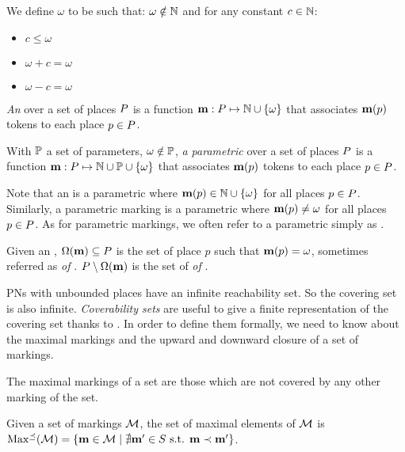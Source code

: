 \begin{defi}[\omark]
  We define $\omega$ to be such that:
  $\omega \notin \mathbb{N}$
  and for any constant $c \in \mathbb{N}$:
  \begin{itemize}
    \item $c \leq \omega$
    \item $\omega + c = \omega$
    \item $\omega - c = \omega$
  \end{itemize}

  \emph{An \omark} \mar over a set of places $P$ is a function $\mathbf{m} : P \mapsto \mathbb{N} \cup \{\omega\}$ that associates $\mathbf{m}(p)$ tokens to each place $p \in P$.

  With $\mathbb{P}$ a set of parameters, $\omega \notin \mathbb{P}$,
  \emph{a parametric \omark} \mar over a set of places $P$ is a function $\mathbf{m} : P \mapsto \mathbb{N} \cup \mathbb{P} \cup \{\omega\}$ that associates $\mathbf{m}(p)$ tokens to each place $p \in P$.
\end{defi}

Note that an \omark \mar is a parametric \omark where $\mathbf{m}(p) \in \mathbb{N} \cup \{\omega\}$ for all places $p \in P$.
Similarly, a parametric marking \mar is a parametric \omark where $\mathbf{m}(p) \neq \omega$ for all places $p \in P$.
As for parametric markings, we often refer to a parametric \omark simply as \omark.

Given an \omark \mar, $\operatorname{\Omega}(\mathbf{m}) \subseteq P$ is the set of place $p$ such that $\mathbf{m}(p) = \omega$, sometimes referred as \emph{\oplaces of \mar}. $P \setminus \operatorname{\Omega}(\mathbf{m})$ is the set of \emph{\noplaces of \mar}.

\acp{PN} with unbounded places have an infinite reachability set.
So the covering set is also infinite.
\emph{Coverability sets} are useful to give a finite representation of the covering set thanks to \omarks.
In order to define them formally, we need to know about the maximal markings and the upward and downward closure of a set of markings.

The maximal markings of a set are those which are not covered by any other marking of the set.
\begin{defi}
  Given a set of markings $\mathcal{M}$, the set of maximal elements of $\mathcal{M}$ is
  $\operatorname{Max^\preceq}(\mathcal{M}) = \left\{ \mathbf{m} \in \mathcal{M} \mid \nexists \mathbf{m}' \in S \text{ s.t. } \mathbf{m} \prec \mathbf{m}' \right\}$.
\end{defi}


